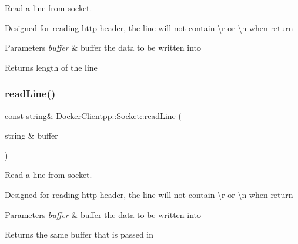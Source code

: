 Read a line from socket. 

Designed for reading http header, the line will not contain \textquotesingle{}\textbackslash{}r\textquotesingle{} or \textquotesingle{}\textbackslash{}n\textquotesingle{} when return


\begin{DoxyParams}{Parameters}
{\em buffer} & buffer the data to be written into \\
\hline
\end{DoxyParams}
\begin{DoxyReturn}{Returns}
length of the line 
\end{DoxyReturn}
\mbox{\label{classDockerClientpp_1_1Socket_a169f865711e359895ece36cd2f6b95ad}} 
\subsubsection{\texorpdfstring{readLine()}{readLine()}\hspace{0.1cm}{\footnotesize\ttfamily [2/2]}}
{\footnotesize\ttfamily const string\& Docker\+Clientpp\+::\+Socket\+::read\+Line (\begin{DoxyParamCaption}\item[{string \&}]{buffer }\end{DoxyParamCaption})}



Read a line from socket. 

Designed for reading http header, the line will not contain \textquotesingle{}\textbackslash{}r\textquotesingle{} or \textquotesingle{}\textbackslash{}n\textquotesingle{} when return


\begin{DoxyParams}{Parameters}
{\em buffer} & buffer the data to be written into \\
\hline
\end{DoxyParams}
\begin{DoxyReturn}{Returns}
the same buffer that is passed in 
\end{DoxyReturn}
\mbox{\label{classDockerClientpp_1_1Socket_ac87760933efbd8a2d7729c45ec04df22}} 
